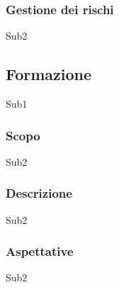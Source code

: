 \documentclass[../norme-di-progetto.tex]{subfiles}
\begin{document}
    \subsubsection{Gestione dei rischi}
    Sub2

\subsection{Formazione}
Sub1
    \subsubsection{Scopo}
    Sub2
    \subsubsection{Descrizione}
    Sub2
    \subsubsection{Aspettative}
    Sub2
\end{document}
